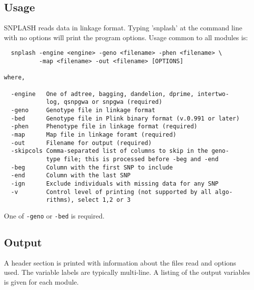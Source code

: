 \subsection{Usage}
SNPLASH reads data in linkage format. Typing 'snplash' at the command line with
no options will print the program options. Usage common to all modules is:

\begin{verbatim}
  snplash -engine <engine> -geno <filename> -phen <filename> \
          -map <filename> -out <filename> [OPTIONS]

where,

  -engine   One of adtree, bagging, dandelion, dprime, intertwo-
            log, qsnpgwa or snpgwa (required)
  -geno     Genotype file in linkage format
  -bed      Genotype file in Plink binary format (v.0.991 or later)
  -phen     Phenotype file in linkage format (required)
  -map      Map file in linkage foramt (required)
  -out      Filename for output (required)
  -skipcols Comma-separated list of columns to skip in the geno-
            type file; this is processed before -beg and -end
  -beg      Column with the first SNP to include
  -end      Column with the last SNP
  -ign      Exclude individuals with missing data for any SNP
  -v        Control level of printing (not supported by all algo-
            rithms), select 1,2 or 3
\end{verbatim}                       
      
One of \verb|-geno| or \verb|-bed| is required.

\subsection{Output}

A header section is printed with information about the files read and options
used.  The variable labels are typically multi-line.  A listing of the output
variables is given for each module.

